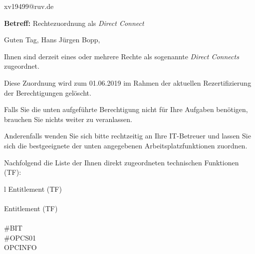 \documentclass[a4paper,landscape,12pt]{letter}
\begin{document}
\begin{letter}{xv19499@ruv.de\hfill \break}
\begin{normalsize}
	\opening{\textbf{Betreff:} Rechtezuordnung als \emph{Direct Connect}}
	\begin{normalsize} \hfill
	\end{normalsize}

	\begin{normalsize}
		Guten Tag, 
	Hans Jürgen Bopp, \hfill \break
	\end{normalsize}
	\end{normalsize}
	
\begin{normalsize}
	Ihnen sind derzeit eines oder mehrere Rechte als sogenannte \emph{Direct Connects} zugeordnet.
	
	Diese Zuordnung wird zum 01.06.2019 im Rahmen der aktuellen Rezertifizierung der Berechtigungen gelöscht.
	
	Falls Sie die unten aufgeführte Berechtigung nicht für Ihre Aufgaben benötigen, 
	brauchen Sie nichts weiter zu veranlassen.
	
	Anderenfalls wenden Sie sich bitte rechtzeitig an Ihre IT-Betreuer 
	und lassen Sie sich die bestgeeignete der unten angegebenen Arbeitsplatzfunktionen zuordnen.
	\end{normalsize}
	
\begin{normalsize}
	Nachfolgend die Liste der Ihnen direkt zugeordneten technischen Funktionen (TF):

	\begin{longtable}{l}
		Entitlement (TF) \\ \hline
		\endfirsthead
		\\\hline
		Entitlement (TF) \\ \hline
		\endhead %
		\multicolumn{1}{r@{}}{Fortsetzung \ldots}\\
		\endfoot
		\hline
		\endlastfoot
	\#BIT\\\#OPCS01\\OPCINFO\\
	\end{longtable}
	\end{normalsize}
	

\end{letter}
\end{document}
